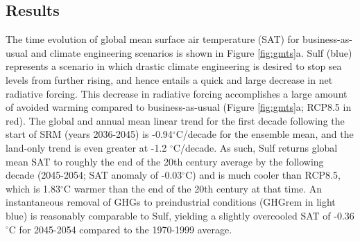 \documentclass[grl]{AGUTeX}  %
\begin{document}
\begin{article}

\section{Results}

The time evolution of global mean surface air temperature (SAT) for business-as-usual and climate engineering scenarios is shown in Figure \ref{fig:gmts}a. Sulf (blue) represents a scenario in which drastic climate engineering is desired to stop sea levels from further rising, and hence entails a quick and large decrease in net radiative forcing. This decrease in radiative forcing accomplishes a large amount of avoided warming compared to business-as-usual (Figure \ref{fig:gmts}a; RCP8.5 in red). The global and annual mean linear trend for the first decade following the start of SRM (years 2036-2045) is -0.94$^\circ$C/decade for the ensemble mean, and the land-only trend is even greater at -1.2 $^\circ$C/decade. As such, Sulf returns global mean SAT to roughly the end of the 20th century average by the following decade (2045-2054; SAT anomaly of -0.03$^\circ$C) and is much cooler than RCP8.5, which is 1.83$^\circ$C warmer than the end of the 20th century at that time. An instantaneous removal of GHGs to preindustrial conditions (GHGrem in light blue) is reasonably comparable to Sulf, yielding a slightly overcooled SAT of -0.36$^\circ$C for 2045-2054 compared to the 1970-1999 average. %


\end{article}
\end{document}
